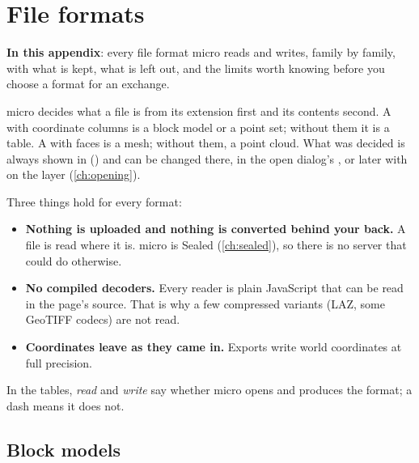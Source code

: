 \chapter{File formats}\label{app:formats}\label{ch:formats}

\begin{goals}
\textbf{In this appendix}: every file format micro reads and writes, family by family, with what is
kept, what is left out, and the limits worth knowing before you choose a format for an exchange.
\end{goals}

micro decides what a file is from its extension first and its contents second. A  with
coordinate columns is a block model or a point set; without them it is a table. A  with
faces is a mesh; without them, a point cloud. What was decided is always shown in 
() and can be changed there, in the open dialog's , or later with
 on the layer (\cref{ch:opening}).

Three things hold for every format:

\begin{itemize}
\item \textbf{Nothing is uploaded and nothing is converted behind your back.} A file is read where
  it is. micro is Sealed (\cref{ch:sealed}), so there is no server that could do otherwise.
\item \textbf{No compiled decoders.} Every reader is plain JavaScript that can be read in the page's
  source. That is why a few compressed variants (LAZ, some GeoTIFF codecs) are not read.
\item \textbf{Coordinates leave as they came in.} Exports write world coordinates at full
  precision.
\end{itemize}

In the tables, \emph{read} and \emph{write} say whether micro opens and produces the format; a dash
means it does not.

\section{Block models}\label{sec:formats-blocks}

